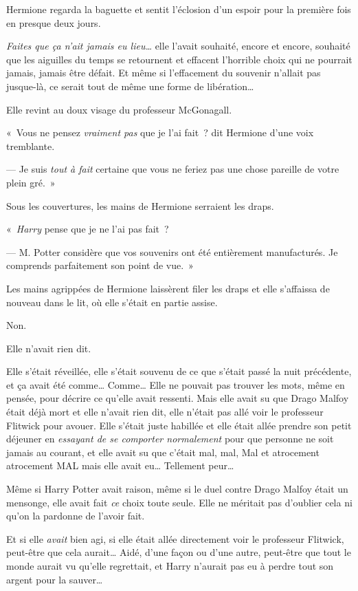 Hermione regarda la baguette et sentit l'éclosion d'un espoir pour la première fois en presque deux jours.

\emph{Faites que ça n'ait jamais eu lieu…} elle l'avait souhaité, encore et encore, souhaité que les aiguilles du temps se retournent et effacent l'horrible choix qui ne pourrait jamais, jamais être défait.
Et même si l'effacement du souvenir n'allait pas jusque-là, ce serait tout de même une forme de libération…

Elle revint au doux visage du professeur McGonagall.

«~Vous ne pensez \emph{vraiment pas} que je l'ai fait~? dit Hermione d'une voix tremblante.

--- Je suis \emph{tout à fait} certaine que vous ne feriez pas une chose pareille de votre plein gré.~»

Sous les couvertures, les mains de Hermione serraient les draps.

«~\emph{Harry} pense que je ne l'ai pas fait~?

--- M. Potter considère que vos souvenirs ont été entièrement manufacturés.
Je comprends parfaitement son point de vue.~»

Les mains agrippées de Hermione laissèrent filer les draps et elle s'affaissa de nouveau dans le lit, où elle s'était en partie assise.

Non.

Elle n'avait rien dit.

Elle s'était réveillée, elle s'était souvenu de ce que s'était passé la nuit précédente, et ça avait été comme…
Comme… Elle ne pouvait pas trouver les mots, même en pensée, pour décrire ce qu'elle avait ressenti.
Mais elle avait su que Drago Malfoy était déjà mort et elle n'avait rien dit, elle n'était pas allé voir le professeur Flitwick pour avouer.
Elle s'était juste habillée et elle était allée prendre son petit déjeuner en \emph{essayant de se comporter normalement} pour que personne ne soit jamais au courant, et elle avait su que c'était mal, mal, Mal et atrocement atrocement MAL mais elle avait eu…
Tellement peur…

Même si Harry Potter avait raison, même si le duel contre Drago Malfoy était un mensonge, elle avait fait \emph{ce} choix toute seule.
Elle ne méritait pas d'oublier cela ni qu'on la pardonne de l'avoir fait.

Et si elle \emph{avait} bien agi, si elle était allée directement voir le professeur Flitwick, peut-être que cela aurait…
Aidé, d'une façon ou d'une autre, peut-être que tout le monde aurait vu qu'elle regrettait, et Harry n'aurait pas eu à perdre tout son argent pour la sauver…

